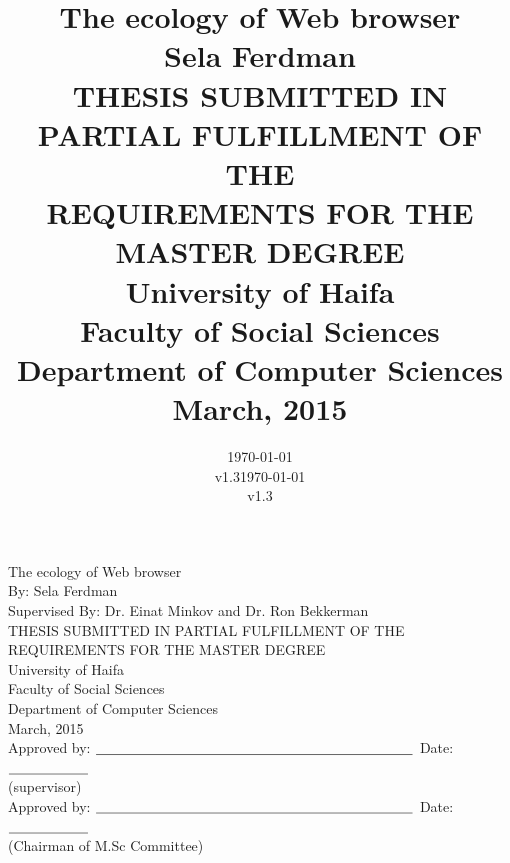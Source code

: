\documentclass[11pt,oneside]{book}
\newcommand{\bigspace}{\mbox{\hspace{10mm}}}
\begin{document}
\date{\today\\v1.3}
\title{\Huge{The ecology of Web browser}
                \huge
             \\[10mm] Sela Ferdman
             \\[25mm] \Large THESIS SUBMITTED IN PARTIAL FULFILLMENT OF THE
             \\       REQUIREMENTS FOR THE MASTER DEGREE
             \\[15mm] University of Haifa
             \\       Faculty of Social Sciences
             \\       Department of Computer Sciences
             \\[10mm] March, 2015
}
\date{\today\\v1.3}
\maketitle{}

\pagestyle{plain}

\begin{center}
\Huge
     The ecology of Web browser
\huge
\\[10mm] By: Sela Ferdman
\\[3mm] Supervised By: Dr. Einat Minkov and Dr. Ron Bekkerman
\Large
\\ [10mm]THESIS SUBMITTED IN PARTIAL FULFILLMENT OF THE
\\ REQUIREMENTS FOR THE MASTER DEGREE
\\ [10mm]University of Haifa
\\ [1mm]Faculty of Social Sciences
\\ [1mm]Department of Computer Sciences
\\ [3mm]March, 2015
\\ [8mm] Approved by:
$\underline{\bigspace\bigspace\bigspace\bigspace\bigspace\bigspace\bigspace\bigspace}$
   \bigspace    Date:$\underline{\bigspace\bigspace}$
\\ (supervisor)\bigspace
\\ [3mm]Approved by:
$\underline{\bigspace\bigspace\bigspace\bigspace\bigspace\bigspace\bigspace\bigspace}$
   \bigspace    Date:$\underline{\bigspace\bigspace}$
\\ (Chairman of  M.Sc Committee) \bigspace

\end{center}

\end{document}
